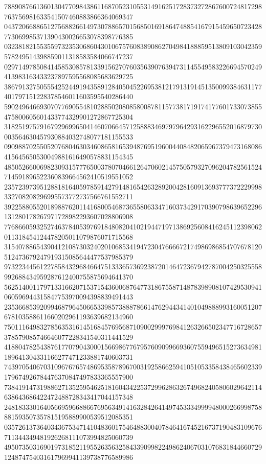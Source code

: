 \begin{DoxyCode}
      788908766136013047709843861168705231055314916251728373272867600724817298763756981633541507460883866364069347
      043720668865127568826614973078865701568501691864748854167915459650723428773069985371390430026653078398776385
      032381821553559732353068604301067576083890862704984188859513809103042359578249514398859011318583584066747237
      029714978508414585308578133915627076035639076394731145549583226694570249413983163433237897595568085683629725
      386791327505554252449194358912840504522695381217913191451350099384631177401797151228378546011603595540286440
      590249646693070776905548102885020808580087811577381719174177601733073855475800605601433774329901272867725304
      318251975791679296996504146070664571258883469797964293162296552016879730003564630457930884032748077181155533
      090988702550520768046303460865816539487695196004408482065967379473168086415645650530049881616490578831154345
      485052660069823093157776500378070466126470602145750579327096204782561524714591896522360839664562410519551052
      235723973951288181640597859142791481654263289200428160913693777372229998332708208296995573772737566761552711
      392258805520189887620114168005468736558063347160373429170390798639652296131280178267971728982293607028806908
      776866059325274637840539769184808204102194471971386925608416245112398062011318454124478205011079876071715568
      315407886543904121087303240201068534194723047666672174986986854707678120512473679247919315085644477537985379
      973223445612278584329684664751333657369238720146472367942787004250325558992688434959287612400755875694641370
      562514001179713316620715371543600687647731867558714878398908107429530941060596944315847753970094398839491443
      235366853920994687964506653398573888786614762944341401049888993160051207678103588611660202961193639682134960
      750111649832785635316145168457695687109002999769841263266502347716728657378579085746646077228341540311441529
      418804782543876177079043000156698677679576090996693607559496515273634981189641304331166277471233881740603731
      743970540670310967676574869535878967003192586625941051053358438465602339179674926784476370847497833365557900
      738419147319886271352595462518160434225372996286326749682405806029642114638643686422472488728343417044157348
      248183330164056695966886676956349141632842641497453334999948000266998758881593507357815195889900539512085351
      035726137364034367534714104836017546488300407846416745216737190483109676711344349481926268111073994825060739
      495073503169019731852119552635632584339099822498624067031076831844660729124874754031617969941139738776589986

\end{DoxyCode}
